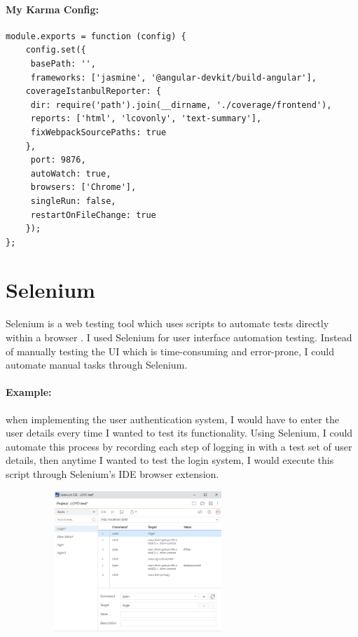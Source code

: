 \paragraph{My Karma Config:}
\begin{verbatim}
module.exports = function (config) {
	config.set({
	 basePath: '',
	 frameworks: ['jasmine', '@angular-devkit/build-angular'],
	coverageIstanbulReporter: {
	 dir: require('path').join(__dirname, './coverage/frontend'),
	 reports: ['html', 'lcovonly', 'text-summary'],
	 fixWebpackSourcePaths: true
	},
	 port: 9876,
	 autoWatch: true,
	 browsers: ['Chrome'],
	 singleRun: false,
	 restartOnFileChange: true
	});
};

\end{verbatim}

\section{Selenium}
Selenium is a web testing tool which uses scripts to automate tests directly within a browser \cite{holmes2006automating}. I used Selenium for user interface automation testing. Instead of manually testing the UI which is time-consuming and error-prone, I could automate manual tasks through Selenium.

\paragraph{Example:}when implementing the user authentication system, I would have to enter the user details every time I wanted to test its functionality. Using Selenium, I could automate this process by recording each step of logging in with a test set of user details, then anytime I wanted to test the login system, I would execute this script through Selenium's IDE browser extension.
\begin{center}
\includegraphics[width=10cm,height=5.3cm,keepaspectratio]{img/Selenium.png}
\end{center}

